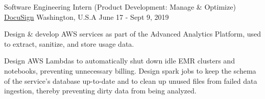 \begin{cventries}
  \cvwork
    {Software Engineering Intern (Product Development: Manage \& Optimize)} %
    {\href{https://www.docusign.com/}{DocuSign}} %
    {Washington, U.S.A} %
    {June 17 - Sept 9, 2019} %
    {
      \begin{cvitems} %
        \item {
          Design \& develop AWS services as part of the Advanced Analytics Platform, used to extract, sanitize, and store usage data.
        }
        \item {
          Design AWS Lambdas to automatically shut down idle EMR clusters and notebooks, preventing unnecessary billing.
          Design spark jobs to keep the schema of the service's database up-to-date and to clean up unused files from failed data ingestion, thereby preventing dirty data from being analyzed.
        }
      \end{cvitems}
    }

\end{cventries}
